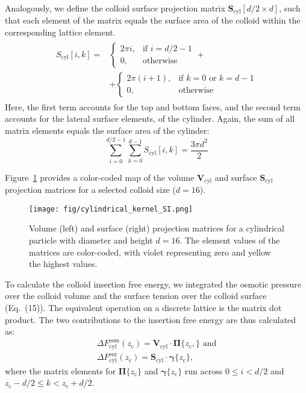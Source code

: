 \documentclass[10pt, a4paper, twocolumn]{article}
\begin{document}
Analogously, we define the colloid surface projection matrix $\bm{S}_{\text{cyl}}[d/2 \times d]$, such that each element of the matrix equals the surface area of the colloid within the corresponding lattice element.
\begin{align}
    \begin{split}
        S_{\text{cyl}}[i, k] = 
        &\begin{cases}
            2 \pi i,   & \text{if } i = d/2 - 1 \\
            0,         & \text{otherwise}
        \end{cases} +
        \\
        &+
        \begin{cases}
            2 \pi (i + 1), & \text{if } k = 0 \text{ or } k = d - 1 \\
            0,             & \text{otherwise}
        \end{cases}
    \end{split}
\end{align}
Here, the first term accounts for the top and bottom faces, and the second term accounts for the lateral surface elements, of the cylinder.
Again, the sum of all matrix elements equals the surface area of the cylinder:
\begin{equation*}
    \sum_{i=0}^{d/2 - 1} \sum_{k=0}^{d - 1} S_{\text{cyl}}[i, k] = \frac{3 \pi d^2}{2}
\end{equation*}

Figure~\ref{fig:cylindrical_kernel_SI} provides a color-coded map of the volume $\bm{V}_{\text{cyl}}$ and surface $\bm{S}_{\text{cyl}}$ projection matrices for a selected colloid size ($d = 16$).

\begin{figure}[h]
    \centering
    \texttt{[image: fig/cylindrical\_kernel\_SI.png]}
    \caption{
    Volume (left) and surface (right) projection matrices for a cylindrical particle with diameter and height $d = 16$. The element values of the matrices are color-coded, with violet representing zero and yellow the highest values.
    }
    \label{fig:cylindrical_kernel_SI}
\end{figure}

To calculate the colloid insertion free energy, we integrated the osmotic pressure over the colloid volume and the surface tension over the colloid surface (Eq.~(15)).
The equivalent operation on a discrete lattice is the matrix dot product.
The two contributions to the insertion free energy are thus calculated as:
\begin{equation}\label{eq:cyl_fe_osm}
    \begin{split}
        \Delta F_{\text{cyl}}^{\text{osm}}(z_{\text{c}}) = \bm{V}_{\text{cyl}} \cdot \boldsymbol{\Pi}\{z_{\text{c}},\} \text{ and}
        \\
        \Delta F_{\text{cyl}}^{\text{sur}}(z_{\text{c}}) = \bm{S}_{\text{cyl}} \cdot \boldsymbol{\gamma}\{z_{\text{c}}\},
    \end{split}
\end{equation}
where the matrix elements for $\boldsymbol{\Pi}\{z_{\text{c}}\}$ and $\boldsymbol{\gamma}\{z_{\text{c}}\}$ run across $0 \leq i < d/2$ and $z_{\text{c}} - d/2 \leq k < z_{\text{c}} + d/2$.
\end{document}
